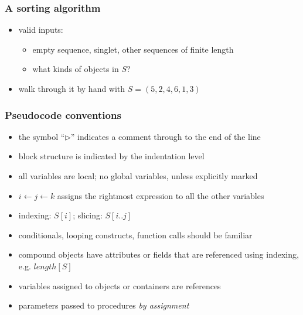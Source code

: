 \begin{frame}[fragile]
%
  \frametitle{A sorting algorithm}
%
    \begin{center}
      \begin{minipage}{.75\linewidth}
        \begin{algorithm}[H]
          \label{alg:insertion-sort}
%
          \dontprintsemicolon
          \setalcaphskip{0ex}
%
          \caption{\insertionsort($S$)}
          \vspace{.5em}
%
%
          \vspace{.5em}
%
        \end{algorithm}
      \end{minipage}
    \end{center}
%
  \begin{itemize}
%
  \item valid inputs:
    \begin{itemize}
    \item empty sequence, singlet, other sequences of finite length
    \item what kinds of objects in $S$?
    \end{itemize}
%
  \item walk through it by hand with $S = (5, 2, 4, 6, 1, 3)$
%
  \end{itemize}
%
\end{frame}

\begin{frame}[fragile]
%
  \frametitle{Pseudocode conventions}
%
  \begin{itemize}
  \item the symbol ``$\triangleright$'' indicates a comment through to the end of the line
  \item block structure is indicated by the indentation level
  \item all variables are local; no global variables, unless explicitly marked
  \item $i \leftarrow j \leftarrow k$ assigns the rightmost expression to all the other
    variables
  \item indexing: $S[i]$; slicing: $S[i .. j]$
  \item conditionals, looping constructs, function calls should be familiar
  \item compound objects have attributes or fields that are referenced using indexing,
    e.g. $length[S]$
  \item variables assigned to objects or containers are references
  \item parameters passed to procedures {\em by assignment}
  \end{itemize}
%
\end{frame}
        
